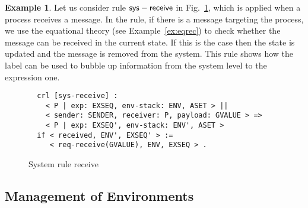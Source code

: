\documentclass{article}[12pt,a4paper]
\theoremstyle{definition}
\newtheorem{example}{Example}[section]
\begin{document}
\begin{example}\label{ex:rec}
  Let us consider rule $\mathsf{sys-receive}$ in Fig.~\ref{fig:rule-rec}, which 
  is applied when a process receives a message. In the rule, if there is a
  message targeting the process, we use the equational theory (see
  Example~\ref{ex:eqrec}) to check whether the message can be received in the
  current state. If this is the case then the state is updated and the message
  is removed from the system. This rule shows how the label can be used to
  bubble up information from the system level to the expression one.
\end{example}

\begin{figure}[t]
  \centering
\begin{verbatim}
  crl [sys-receive] :
    < P | exp: EXSEQ, env-stack: ENV, ASET > ||
    < sender: SENDER, receiver: P, payload: GVALUE > =>
    < P | exp: EXSEQ', env-stack: ENV', ASET >
  if < received, ENV', EXSEQ' > :=
     < req-receive(GVALUE), ENV, EXSEQ > .
\end{verbatim}
  \caption{System rule receive}
  \label{fig:rule-rec}
\end{figure}


\subsection{Management of Environments}
\end{document}
